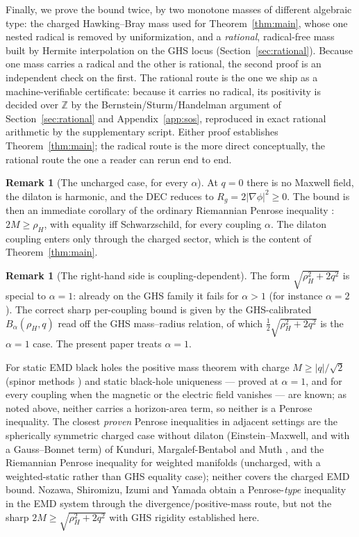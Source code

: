 \documentclass[11pt]{article}
\theoremstyle{plain}
\theoremstyle{definition}
\newtheorem{remark}[theorem]{Remark}
\newcommand{\rH}{\rho_{\!H}}
\begin{document}
Finally, we prove the bound twice, by two monotone masses of different algebraic type: the charged Hawking--Bray
mass used for Theorem~\ref{thm:main}, whose one nested radical is removed by uniformization, and a
\emph{rational}, radical-free mass built by Hermite interpolation on the GHS locus (Section~\ref{sec:rational}).
Because one mass carries a radical and the other is rational, the second proof is an independent check on the first.
The rational route is the one we ship as a machine-verifiable certificate: because it carries no radical, its
positivity is decided over $\mathbb Z$ by the Bernstein/Sturm/Handelman argument of Section~\ref{sec:rational}
and Appendix~\ref{app:sos}, reproduced in exact rational arithmetic by the supplementary script. Either proof
establishes Theorem~\ref{thm:main}; the radical route is the more direct conceptually, the rational route the
one a reader can rerun end to end.

\begin{remark}[The uncharged case, for every $\alpha$]\label{rmk:q0}
At $q=0$ there is no Maxwell field, the dilaton is harmonic, and the DEC reduces to
$R_g=2|\nabla\phi|^2\ge0$. The bound is then an immediate corollary of the ordinary Riemannian Penrose
inequality \cite{HuiskenIlmanen,Bray}: $2M\ge\rH$, with equality iff Schwarzschild, for every coupling
$\alpha$. The dilaton coupling enters only through the charged sector, which is the content of
Theorem~\ref{thm:main}.
\end{remark}

\begin{remark}[The right-hand side is coupling-dependent]\label{rmk:genalpha}
The form $\sqrt{\rH^2+2q^2}$ is special to $\alpha=1$: already on the GHS family it fails for $\alpha>1$ (for
instance $\alpha=2$). The correct sharp per-coupling bound is given by the GHS-calibrated
$B_\alpha(\rH,q)$ read off the GHS mass--radius relation, of which $\tfrac12\sqrt{\rH^2+2q^2}$ is the
$\alpha=1$ case. The present paper treats $\alpha=1$.
\end{remark}

For static EMD black holes the positive mass theorem with charge $M\ge|q|/\sqrt2$ (spinor methods
\cite{Nozawa,Rogatko,NozawaShiromizu}) and static black-hole uniqueness \cite[Theorem 1]{MarsSimon} --- proved
at $\alpha=1$, and for every coupling when the magnetic or the electric field vanishes --- are known; as noted
above, neither carries a horizon-area term, so neither is a Penrose inequality. The closest \emph{proven}
Penrose inequalities in
adjacent settings are the spherically symmetric charged case without dilaton (Einstein--Maxwell, and with a
Gauss--Bonnet term) of Kunduri, Margalef-Bentabol and Muth \cite{Kunduri}, and the Riemannian Penrose
inequality for weighted manifolds \cite{McCormickWeighted} (uncharged, with a weighted-static rather than GHS
equality case); neither covers the charged EMD bound. Nozawa, Shiromizu, Izumi and Yamada \cite{NSIY} obtain a
Penrose-\emph{type} inequality in the EMD system through the divergence/positive-mass route, but not the sharp
$2M\ge\sqrt{\rH^2+2q^2}$ with GHS rigidity established here.
\end{document}
